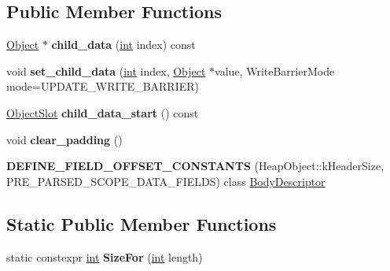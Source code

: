 \subsection*{Public Member Functions}
\begin{DoxyCompactItemize}
\item 
\mbox{\label{classv8_1_1internal_1_1PreParsedScopeData_a082b5dba293dc8323b089a76b2ee9107}} 
\mbox{\hyperlink{classv8_1_1internal_1_1Object}{Object}} $\ast$ {\bfseries child\+\_\+data} (\mbox{\hyperlink{classint}{int}} index) const
\item 
\mbox{\label{classv8_1_1internal_1_1PreParsedScopeData_afef2ff3f22a69ae18eb0a8b0617d05b8}} 
void {\bfseries set\+\_\+child\+\_\+data} (\mbox{\hyperlink{classint}{int}} index, \mbox{\hyperlink{classv8_1_1internal_1_1Object}{Object}} $\ast$value, Write\+Barrier\+Mode mode=U\+P\+D\+A\+T\+E\+\_\+\+W\+R\+I\+T\+E\+\_\+\+B\+A\+R\+R\+I\+ER)
\item 
\mbox{\label{classv8_1_1internal_1_1PreParsedScopeData_a4280cf4a4742d533264a14acbacd468a}} 
\mbox{\hyperlink{classv8_1_1internal_1_1ObjectSlot}{Object\+Slot}} {\bfseries child\+\_\+data\+\_\+start} () const
\item 
\mbox{\label{classv8_1_1internal_1_1PreParsedScopeData_afde04d9ddc3cbdb1078534cec4cd5c84}} 
void {\bfseries clear\+\_\+padding} ()
\item 
\mbox{\label{classv8_1_1internal_1_1PreParsedScopeData_a14e487244d1745371f2c8ffa2b80671f}} 
{\bfseries D\+E\+F\+I\+N\+E\+\_\+\+F\+I\+E\+L\+D\+\_\+\+O\+F\+F\+S\+E\+T\+\_\+\+C\+O\+N\+S\+T\+A\+N\+TS} (Heap\+Object\+::k\+Header\+Size, P\+R\+E\+\_\+\+P\+A\+R\+S\+E\+D\+\_\+\+S\+C\+O\+P\+E\+\_\+\+D\+A\+T\+A\+\_\+\+F\+I\+E\+L\+DS) class \mbox{\hyperlink{classv8_1_1internal_1_1PreParsedScopeData_1_1BodyDescriptor}{Body\+Descriptor}}
\end{DoxyCompactItemize}
\subsection*{Static Public Member Functions}
\begin{DoxyCompactItemize}
\item 
\mbox{\label{classv8_1_1internal_1_1PreParsedScopeData_ae7d109e4a81d394557f55e300746e999}} 
static constexpr \mbox{\hyperlink{classint}{int}} {\bfseries Size\+For} (\mbox{\hyperlink{classint}{int}} length)
\end{DoxyCompactItemize}
